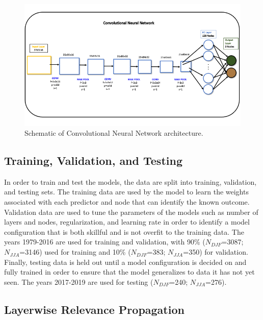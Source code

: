 \documentclass{ametsocV6.1}
\begin{document}
\begin{figure}[t]
  \noindent\includegraphics[width=35pc,angle=0]{Figure3.png}
  \caption{Schematic of Convolutional Neural Network architecture.}\label{f3}
\end{figure}

\subsection{Training, Validation, and Testing}
\label{sec:tvt}

In order to train and test the models, the data are split into training, validation, and testing sets.  The training data are used by the model to learn the weights associated with each predictor and node that can identify the known outcome.  Validation data are used to tune the parameters of the models such as number of layers and nodes, regularization, and learning rate in order to identify a model configuration that is both skillful and is not overfit to the training data.  The years 1979-2016 are used for training and validation, with 90\% ($N_{DJF}$=3087; $N_{JJA}$=3146) used for training and 10\% ($N_{DJF}$=383; $N_{JJA}$=350) for validation. Finally, testing data is held out until a model configuration is decided on and fully trained in order to ensure that the model generalizes to data it has not yet seen. The years 2017-2019 are used for testing ($N_{DJF}$=240; $N_{JJA}$=276).

\subsection{Layerwise Relevance Propagation}
\label{sec:lrp}
\end{document}
